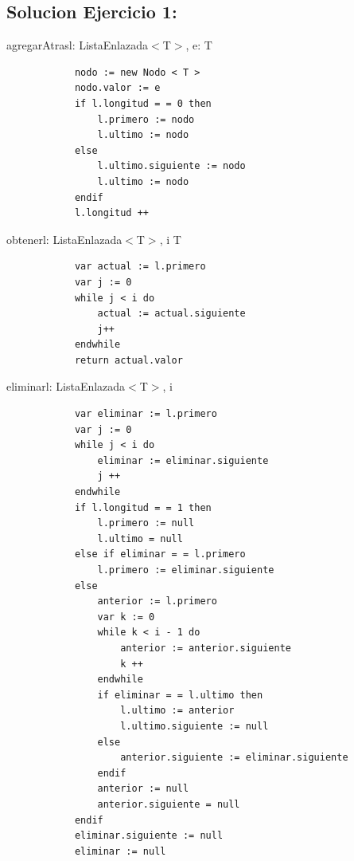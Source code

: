 \documentclass[11pt]{article}
\begin{document}
    \subsection*{Solucion Ejercicio 1:}
    \begin{proc}{agregarAtras}{\Inout l: ListaEnlazada$<$T$>$, \In e: T}{}
        \begin{lstlisting}
            nodo := new Nodo < T >
            nodo.valor := e
            if l.longitud = = 0 then
                l.primero := nodo
                l.ultimo := nodo
            else
                l.ultimo.siguiente := nodo
                l.ultimo := nodo
            endif
            l.longitud ++
        \end{lstlisting}
    \end{proc}

    \begin{proc}{obtener}{\In l: ListaEnlazada$<$T$>$, \In i \ent}{T}
        \begin{lstlisting}
            var actual := l.primero
            var j := 0
            while j < i do
                actual := actual.siguiente
                j++
            endwhile
            return actual.valor
        \end{lstlisting}
    \end{proc}
    \begin{proc}{eliminar}{\Inout l: ListaEnlazada$<$T$>$, \In i \ent}{}
        \begin{lstlisting}
            var eliminar := l.primero
            var j := 0
            while j < i do
                eliminar := eliminar.siguiente
                j ++
            endwhile
            if l.longitud = = 1 then
                l.primero := null
                l.ultimo = null
            else if eliminar = = l.primero
                l.primero := eliminar.siguiente
            else
                anterior := l.primero
                var k := 0
                while k < i - 1 do
                    anterior := anterior.siguiente
                    k ++
                endwhile
                if eliminar = = l.ultimo then
                    l.ultimo := anterior
                    l.ultimo.siguiente := null
                else
                    anterior.siguiente := eliminar.siguiente
                endif
                anterior := null
                anterior.siguiente = null
            endif
            eliminar.siguiente := null
            eliminar := null
        \end{lstlisting}
    \end{proc}
\end{document}
